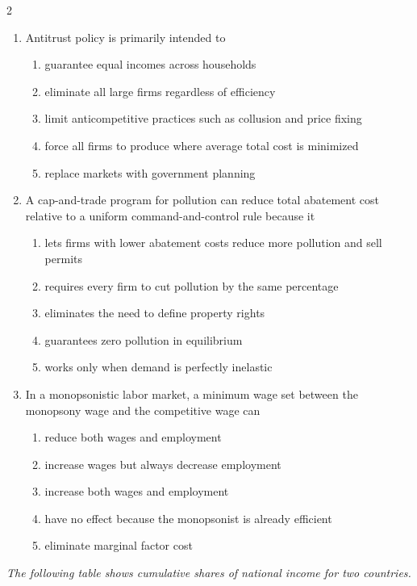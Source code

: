 \documentclass[10pt]{article}
\newenvironment{choiceslist}
  {\begin{enumerate}[label=(\Alph*), leftmargin=1.6em, itemsep=0.12em, topsep=0.18em, parsep=0pt]}
  {\end{enumerate}}
\newenvironment{stimulus}
  {\begin{center}\begin{minipage}{0.96\columnwidth}\footnotesize\itshape\setlength{\tabcolsep}{3pt}\renewcommand{\arraystretch}{0.96}}
  {\end{minipage}\end{center}}
\begin{document}
\begin{multicols*}{2}
\begin{enumerate}[resume*=apq, leftmargin=*, itemsep=0.85em, topsep=0.2em, parsep=0pt]
\begin{choiceslist}
\item becomes perfectly competitive
\end{choiceslist}
\item Antitrust policy is primarily intended to
\begin{choiceslist}
\item guarantee equal incomes across households
\item eliminate all large firms regardless of efficiency
\item limit anticompetitive practices such as collusion and price fixing
\item force all firms to produce where average total cost is minimized
\item replace markets with government planning
\end{choiceslist}
\item A cap-and-trade program for pollution can reduce total abatement cost relative to a uniform command-and-control rule because it
\begin{choiceslist}
\item lets firms with lower abatement costs reduce more pollution and sell permits
\item requires every firm to cut pollution by the same percentage
\item eliminates the need to define property rights
\item guarantees zero pollution in equilibrium
\item works only when demand is perfectly inelastic
\end{choiceslist}
\item In a monopsonistic labor market, a minimum wage set between the monopsony wage and the competitive wage can
\begin{choiceslist}
\item reduce both wages and employment
\item increase wages but always decrease employment
\item increase both wages and employment
\item have no effect because the monopsonist is already efficient
\item eliminate marginal factor cost
\end{choiceslist}
\end{enumerate}
\begin{stimulus}
The following table shows cumulative shares of national income for two countries.


\end{stimulus}
\end{multicols*}
\end{document}
